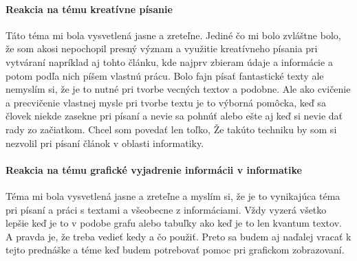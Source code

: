 \documentclass[10pt,twoside,a4paper]{article}
\begin{document}
\paragraph{Reakcia na tému kreatívne písanie}
Táto téma mi bola vysvetlená jasne a zreteľne. Jediné čo mi bolo zvláštne bolo, že som akosi nepochopil presný význam a využitie kreatívneho písania pri vytváraní napríklad aj tohto článku, kde najprv zbieram údaje a informácie a potom podľa nich píšem vlastnú prácu. Bolo fajn písať fantastické texty ale nemyslím si, že je to nutné pri tvorbe vecných textov a podobne. Ale ako cvičenie a precvičenie vlastnej mysle pri tvorbe textu je to výborná pomôcka, keď sa človek niekde zasekne pri písaní a nevie sa pohnúť alebo ešte aj keď si nevie dať rady zo začiatkom. Chcel som povedať len toľko, Že takúto techniku by som si nezvolil pri písaní článok v oblasti informatiky.

\paragraph{Reakcia na tému grafické vyjadrenie informácii v informatike}
Téma mi bola vysvetlená jasne a zreteľne a myslím si, že je to vynikajúca téma pri písaní a práci s textami a všeobecne z informáciami. Vždy vyzerá všetko lepšie keď je to v podobe grafu alebo tabuľky ako keď je to len kvantum textov. A pravda je, že treba vedieť kedy a čo použiť. Preto sa budem aj naďalej vracať k tejto prednáške a téme keď budem potrebovať pomoc pri grafickom zobrazovaní.




\end{document}

